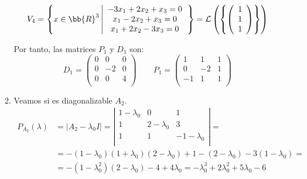 \begin{ejercicio}
\begin{enumerate}
\begin{enumerate}
            \begin{equation*}
            V_4 = \left\{x\in\bb{R}^3 \left| \begin{array}{c}
                 -3x_1+2x_2+x_3 = 0  \\
                 x_1-2x_2+x_3 =0 \\
                 x_1+2x_2-3x_3 = 0
            \end{array}\right.\right\} = \mathcal{L}\left(\left\{ \left(\begin{array}{c}
                    1 \\
                    1 \\
                    1 \\
               \end{array}\right)
               \right\}\right)
            \end{equation*}
    
            Por tanto, las matrices $P_1$ y $D_1$ son:
            \begin{equation*}
                D_1 = \left( \begin{array}{ccc}
                    0 & 0 & 0 \\
                    0 & -2 & 0 \\
                    0 & 0 & 4 \\
                \end{array}\right) \qquad 
                P_1 = \left( \begin{array}{ccc}
                    1 & 1 & 1 \\
                    0 & -2 & 1 \\
                    -1& 1 & 1 \\
                \end{array}\right)
            \end{equation*}

            \item Veamos si es diagonalizable $A_2$.\\
            \begin{equation*}\begin{split}
                P_{A_2}(\lambda) & = |A_2-\lambda_0 I| = \left| \begin{array}{ccc}
                1-\lambda_0 & 0 & 1 \\
                1 & 2-\lambda_0 & 3 \\
                1 & 1 & -1-\lambda_0 \\
                \end{array}\right| =\\
                & = -(1-\lambda_0)(1+\lambda_0)(2-\lambda_0) +1 -(2-\lambda_0)-3(1-\lambda_0) = \\
                &= -(1-\lambda_0^2)(2-\lambda_0) -4 +4\lambda_0 = -\lambda_0^3 +2\lambda_0^2+5\lambda_0-6
            \end{split}\end{equation*}


\end{enumerate}
\end{enumerate}
\end{ejercicio}
